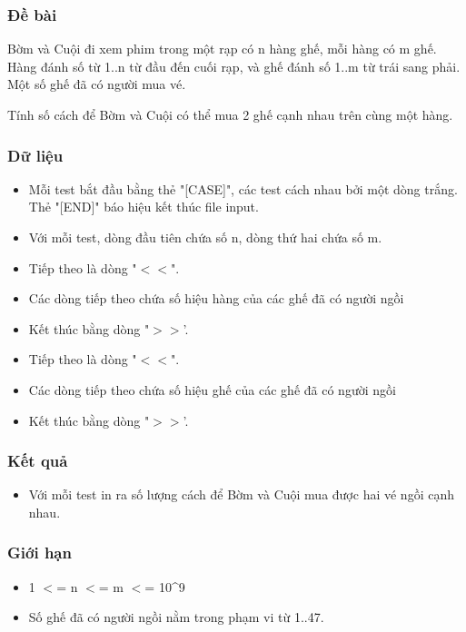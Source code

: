 



\subsubsection{   Đề bài  }

   Bờm và Cuội đi xem phim trong một rạp có n hàng ghế, mỗi hàng có m ghế. Hàng đánh số từ 1..n từ đầu đến cuối rạp, và ghế đánh số 1..m từ trái sang phải. Một số ghế đã có người mua vé.  

   Tính số cách để Bờm và Cuội có thể mua 2 ghế cạnh nhau trên cùng một hàng.  

\subsubsection{   Dữ liệu  }
\begin{itemize}
	\item     Mỗi test bắt đầu bằng thẻ "[CASE]", các test cách nhau bởi một dòng trắng. Thẻ "[END]" báo hiệu kết thúc file input.   
	\item     Với mỗi test, dòng đầu tiên chứa số n, dòng thứ hai chứa số m.   
	\item     Tiếp theo là dòng "$<$$<$".   
	\item     Các dòng tiếp theo chứa số hiệu hàng của các ghế đã có người ngồi   
	\item     Kết thúc bằng dòng "$>$$>$'.   
	\item     Tiếp theo là dòng "$<$$<$".   
	\item     Các dòng tiếp theo chứa số hiệu ghế của các ghế đã có người ngồi   
	\item     Kết thúc bằng dòng "$>$$>$'.   
\end{itemize}

\subsubsection{   Kết quả  }
\begin{itemize}
	\item     Với mỗi test in ra số lượng cách để Bờm và Cuội mua được hai vé ngồi cạnh nhau.   
\end{itemize}

\subsubsection{   Giới hạn  }
\begin{itemize}
	\item     1 $<$= n $<$= m $<$= 10\textasciicircum9   
	\item     Số ghế đã có người ngồi nằm trong phạm vi từ 1..47.   
\end{itemize}

